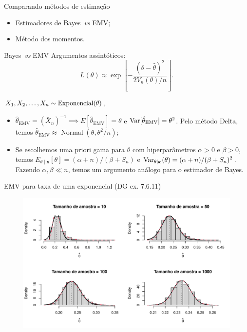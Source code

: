 \begin{frame}{Comparando métodos de estimação}
 \begin{itemize}
  \item Estimadores de Bayes~\textit{vs} EMV;
  \item Método dos momentos.
 \end{itemize}
\end{frame}

\begin{frame}{Bayes~\textit{vs} EMV}
Argumentos assintóticos:
  \begin{equation*}
   L(\theta) \approx \exp\left[-\frac{\left(\theta-\hat{\theta}\right)^2}{2V_n(\theta)/n} \right].
  \end{equation*}
 \begin{exemplo}
    $X_1, X_2, \ldots, X_n \sim \operatorname{Exponencial}(\theta)$, 
    \begin{itemize}
     \item   $\hat{\theta}_{\text{EMV}} = \left(\bar{X}_n\right)^{-1} \implies E[\hat{\theta}_{\text{EMV}}] = \theta$ e $\operatorname{Var}[\hat{\theta}_{\text{EMV}}] = \theta^2$.
  Pelo método Delta, temos $\hat{\theta}_{\text{EMV}} \approx \operatorname{Normal}(\theta, \theta^2/n)$;
    \item Se escolhemos uma priori gama para $\theta$ com hiperparâmetros $\alpha > 0$ e $\beta > 0$,    temos $E_{\theta \mid \boldsymbol{x}}[\theta] = (\alpha + n)/(\beta + S_n)$ e $\operatorname{Var}_{\theta \mid \boldsymbol{x}}(\theta) = (\alpha + n)/ (\beta + S_n)^2$.
    Fazendo $\alpha, \beta \ll n$, temos um argumento análogo para o estimador de Bayes.
    \end{itemize}  
 \end{exemplo}
\end{frame}


\begin{frame}{EMV para taxa de uma exponencial (DG ex. 7.6.11)}
\begin{figure}[!ht]
\label{fig:mle_exponential_deltaMethod}
\begin{center}
\includegraphics[scale=0.6]{figures/exponential_mle_deltaMethod.pdf} 
\end{center} 
\end{figure} 
\end{frame}

